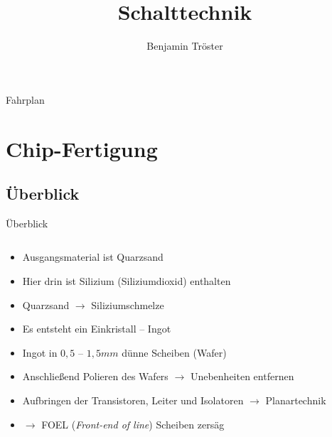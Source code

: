 \documentclass[12pt%
,aspectratio=169%
]{beamer}
\author{Benjamin Tröster}
\title[Schalttechnik \& Logikgatter]{Schalttechnik}
\institute[HTW Berlin]{Hochschule für Technik und Wirtschaft Berlin}
\begin{document}
\begin{frame}
\titlepage
\end{frame}

\begin{frame}{Fahrplan}
\tableofcontents[hideothersubsections]
\end{frame}

\section{Chip-Fertigung}

\subsection{Überblick}

\begin{frame}{Überblick}
\begin{columns}[T] %
\begin{column}{.58\textwidth}
\begin{itemize}
	\item Ausgangsmaterial ist Quarzsand
	\item Hier drin ist Silizium (Siliziumdioxid) enthalten
	\item Quarzsand $\to$ Siliziumschmelze
	\item Es entsteht ein Einkristall -- Ingot
	\item Ingot in $0,5$ -- $1,5 mm$ dünne Scheiben (Wafer)
	\item Anschließend Polieren des Wafers $\to$ Unebenheiten entfernen
	\item Aufbringen der Transistoren, Leiter und Isolatoren $\to$ Planartechnik
	\item $\to$ FOEL (\emph{Front-end of line})
Scheiben zersäg
\end{itemize}
\end{column}%
\hfill%
\begin{column}{.38\textwidth}
\centering
\vspace*{-1cm}

\end{column}
\end{columns}
\end{frame}
\end{document}
